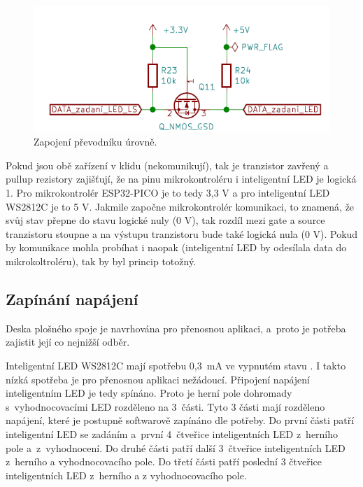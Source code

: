   \begin{figure}[!h]
    \begin{center}
      \includegraphics[scale=0.85]{obrazky/level_shifter.png}
    \end{center}
    \caption[Zapojení převodníků úrovně]{Zapojení převodníku úrovně.}
  \end{figure}

  Pokud jsou obě zařízení v klidu (nekomunikují), tak je tranzistor zavřený a pullup rezistory zajišťují, že na pinu mikrokontroléru
  i inteligentní LED je logická 1. Pro mikrokontrolér ESP32-PICO je to tedy 3,3 V a pro inteligentní LED WS2812C je to 5 V. Jakmile započne
  mikrokontrolér komunikaci, to znamená, že svůj stav přepne do stavu logické nuly (0 V), tak rozdíl mezi gate a source tranzistoru stoupne
  a na výstupu tranzistoru bude také logická nula (0 V). Pokud by komunikace mohla probíhat i naopak (inteligentní LED by odesílala data do
  mikrokoltroléru), tak by byl princip totožný. 

  \subsection{Zapínání napájení}
  Deska plošného spoje je navrhována pro přenosnou aplikaci, a~proto je potřeba zajistit její co nejnižší odběr. 

  Inteligentní LED WS2812C mají spotřebu 0,3~mA ve vypnutém stavu \cite{WS2812C_datasheet}. I takto nízká spotřeba je  pro přenosnou aplikaci 
  nežádoucí. Připojení
  napájení inteligentním LED je tedy spínáno. Proto je herní pole dohromady
  s~vyhodnocovacími LED rozděleno na 3~části. Tyto 3 části mají rozděleno napájení, které je postupně softwarově zapínáno dle potřeby. 
  Do první části patří inteligentní LED se zadáním a~první 4~čtveřice inteligentních LED 
  z~herního pole a~z~vyhodnocení. Do druhé části patří další 3~čtveřice inteligentních LED z~herního a vyhodnocovacího pole. 
  Do třetí části patří poslední 3 čtveřice inteligentních LED z~herního a z vyhodnocovacího pole.

